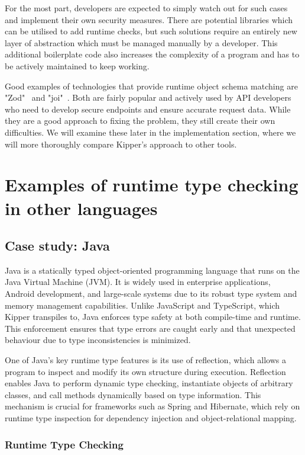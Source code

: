 For the most part, developers are expected to simply watch out for such cases and implement their own security measures. There are potential libraries which can be utilised to add runtime checks, but such solutions require an entirely new layer of abstraction which must be managed manually by a developer. This additional boilerplate code also increases the complexity of a program and has to be actively maintained to keep working.

Good examples of technologies that provide runtime object schema matching are "Zod"~\cite{zod} and "joi"~\cite{joi}. Both are fairly popular and actively used by API developers who need to develop secure endpoints and ensure accurate request data. While they are a good approach to fixing the problem, they still create their own difficulties. We will examine these later in the implementation section, where we will more thoroughly compare Kipper's approach to other tools.

\section{Examples of runtime type checking in other languages}

\subsection{Case study: Java}

Java is a statically typed object-oriented programming language that runs on the Java Virtual Machine (JVM). It is widely used in enterprise applications, Android development, and large-scale systems due to its robust type system and memory management capabilities. Unlike JavaScript and TypeScript, which Kipper \gls{transpile}s to, Java enforces type safety at both compile-time and runtime. This enforcement ensures that type errors are caught early and that unexpected behaviour due to type inconsistencies is minimized.

One of Java’s key runtime type features is its use of 	reflection, which allows a program to inspect and modify its own structure during execution. Reflection enables Java to perform dynamic type checking, instantiate objects of arbitrary classes, and call methods dynamically based on type information. This mechanism is crucial for frameworks such as Spring and Hibernate, which rely on runtime type inspection for dependency injection and object-relational mapping.

\subsubsection{Runtime Type Checking}

